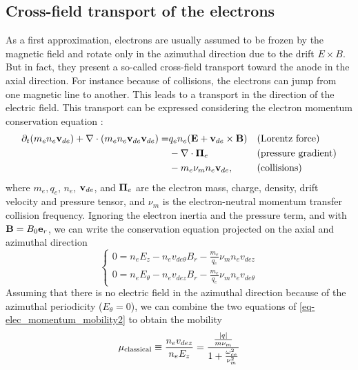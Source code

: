 \subsection{Cross-field transport of the electrons}
  \label{sec-mob}
  
  As a first approximation, electrons are usually assumed to be frozen by the magnetic field and rotate only in the azimuthal direction due to the drift $E \times B$.
  But in fact, they present a so-called cross-field transport toward the anode in the axial direction.
  For instance because of collisions, the electrons can jump from one magnetic line to another.
  This leads to a transport in the direction of the electric field.
  This transport can be expressed considering the electron momentum conservation equation \citep{lafleur2016a}\string:
  \begin{align*} %
    \partial_t(m_e n_e \vect{v}_{de}) + \div(m_e n_e  \vect{v}_{de} \vect{v}_{de})  = & q_e n_e ( \vect{E} + \vect{v}_{de} \times \vect{B})  &&\text{(Lorentz force)}\\ &- \div \vect{\Pi}_e &&\text{(pressure gradient)}\\ & - m_e \nu_m n_e \vect{v}_{de}, &&\text{(collisions)}
  \end{align*}
  where $m_e, q_e$, $n_e$, ${\mathbf v}_{de}$, and ${\mathbf \Pi}_e $ are the electron mass, charge, density, drift velocity and pressure tensor, and $\nu_m$ is the electron-neutral momentum transfer collision frequency.
  Ignoring the electron inertia and the pressure term, and with ${\mathbf B} = B_0 {\mathbf e}_r$, we can write the conservation equation projected on the axial and azimuthal direction
  \begin{equation} \label{eq-elec_momentum_mobility2}
  \begin{cases}
    0 =  n_e E_z - n_e v_{de{\theta}} B_r - \frac{m_e}{q_e} \nu_m n_e v_{dez}\\
    0 =  n_e E_{\theta} -  n_e v_{dez} B_r - \frac{m_e}{q_e} \nu_m n_e v_{de{\theta}}
  \end{cases}
  \end{equation}
  Assuming that there is no electric field in the azimuthal direction because of the azimuthal periodicity ($E_{\theta}=0$),  we can combine the two equations of \cref{eq-elec_momentum_mobility2} to obtain the mobility \citep{chen2006,meezan2001}
  \begin{equation} \label{eq-mobility}
    \mu_{\mathrm{classical}}   \equiv \frac{n_e v_{dez}}{n_e E_z} = \frac{ \frac{\lvert q\rvert}{m \nu_m}}{1 + \frac{\omega_{ce}^2}{\nu_m^2}}
  \end{equation}

